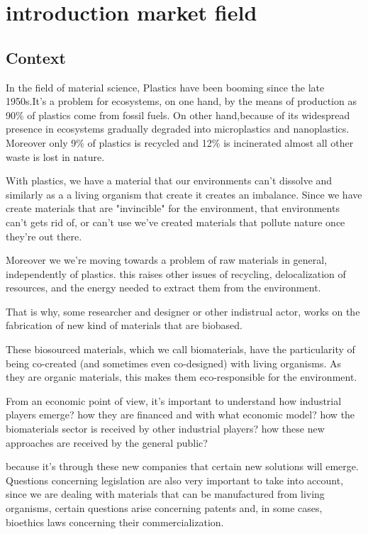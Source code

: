 \chapter{introduction market field}

\section{Context}

In the field of material science, Plastics have been booming since the late 1950s\cite{geyer2017production}.It's a problem for ecosystems, on one hand, by the means of production as 90\% of plastics come from fossil fuels. On other hand,because of its widespread presence in ecosystems gradually degraded into microplastics and nanoplastics. Moreover only 9\% of plastics is recycled and 12\% is incinerated almost all other waste is lost in nature\cite{natureeditorial}.

With plastics, we have a material that our environments can't dissolve and similarly as a a living organism that create it creates an imbalance. Since we have create materials that are "invincible" for the environment,  that environments can't gets rid of, or can't use we've created materials that pollute nature once they're out there.

Moreover we we're moving towards a problem of raw materials in general, independently of plastics. this raises other issues of recycling, delocalization of resources, and the energy needed to extract them from the environment.

That is why, some researcher and designer or other indistrual actor, works on the fabrication of new kind of materials that are biobased.
 
These biosourced materials, which we call biomaterials, have the particularity of being co-created (and sometimes even co-designed) with living organisms. As they are organic materials, this makes them eco-responsible for the environment. 

From an economic point of view, it's important to understand how industrial players emerge? how they are financed and with what economic model? how the biomaterials sector is received by other industrial players? how these new approaches are received by the general public?

because it's through these new companies that certain new solutions will emerge. Questions concerning legislation are also very important to take into account, since we are dealing with materials that can be manufactured from living organisms, certain questions arise concerning patents and, in some cases, bioethics laws concerning their commercialization.  

